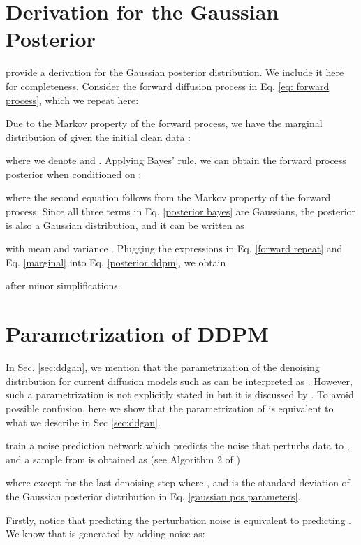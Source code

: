 \section{Derivation for the Gaussian Posterior} \label{app: posterior}
\citet{ho2020denoising} provide a derivation for the Gaussian posterior distribution. We include it here for completeness. Consider the forward diffusion process in Eq. \ref{eq: forward process}, which we repeat here:

Due to the Markov property of the forward process, we have the marginal distribution of  given the initial clean data : 
 
where we denote  and . Applying Bayes' rule, we can obtain the forward process posterior
when conditioned on : 


where the second equation follows from the Markov property of the forward process. Since all three terms in Eq. \ref{posterior bayes} are Gaussians, the posterior  is also a Gaussian distribution, and it can be written as

with mean  and variance . Plugging the expressions in Eq. \ref{forward repeat} and Eq. \ref{marginal} into Eq. \ref{posterior ddpm}, we obtain

after minor simplifications.

\section{Parametrization of DDPM}\label{app: x0 prediction}
In Sec. \ref{sec:ddgan}, we mention that the parametrization of the denoising distribution for current diffusion models such as \citet{ho2020denoising} can be interpreted as . However, such a parametrization is not explicitly stated in \citet{ho2020denoising} but it is discussed by \citet{song2020denoising}. To avoid possible confusion, here we show that the parametrization of \citet{ho2020denoising} is equivalent to what we describe in Sec \ref{sec:ddgan}. 

\citet{ho2020denoising} train a noise prediction network  which predicts the noise that perturbs data  to , and a sample from  is obtained as (see Algorithm 2 of \citet{ho2020denoising})

where  except for the last denoising step where , and  is the standard deviation of the Gaussian posterior distribution in Eq. \ref{gaussian pos parameters}.

Firstly, notice that predicting the perturbation noise  is equivalent to predicting . We know that  is generated by adding  noise as:

